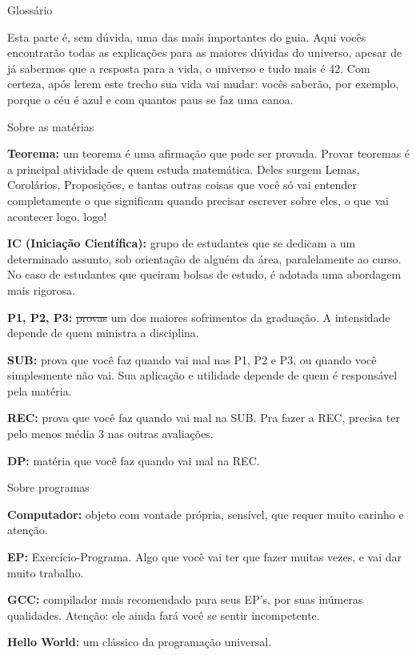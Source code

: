 \begin{secao}{Glossário}

Esta parte é, sem dúvida, uma das mais importantes do guia. Aqui vocês
encontrarão todas as explicações para as maiores dúvidas do universo, apesar de
já sabermos que a resposta para a vida, o universo e tudo mais é 42. Com
certeza, após lerem este trecho sua vida vai mudar: vocês saberão, por exemplo,
porque o céu é azul e com quantos paus se faz uma canoa.

\begin{subsecao}{Sobre as matérias}

{\bf Teorema:} um teorema é uma afirmação que pode ser provada. Provar
teoremas é a principal atividade de quem estuda matemática. Deles surgem Lemas,
Corolários, Proposições, e tantas outras coisas que você só vai entender
completamente o que significam quando precisar escrever sobre eles, o que vai
acontecer logo, logo!

{\bf IC (Iniciação Científica):} grupo de estudantes que se dedicam a um
determinado assunto, sob orientação de alguém da área, paralelamente ao curso.
No caso de estudantes que queiram bolsas de estudo, é adotada uma abordagem
mais rigorosa.

{\bf P1, P2, P3:} \sout{provas} um dos maiores sofrimentos da graduação. 
A intensidade depende de quem ministra a disciplina.

{\bf SUB:} prova que você faz quando vai mal nas P1, P2 e P3, ou quando você
simplesmente não vai. Sua aplicação e utilidade depende de quem é responsável
pela matéria.

{\bf REC:} prova que você faz quando vai mal na SUB. Pra fazer a REC, precisa
ter pelo menos média 3 nas outras avaliações.

{\bf DP:} matéria que você faz quando vai mal na REC.
\end{subsecao}

\begin{subsecao}{Sobre programas}

{\bf Computador:} objeto com vontade própria, sensível, que requer muito
carinho e atenção.

{\bf EP:} Exercício-Programa. Algo que você vai ter que fazer muitas vezes, e
vai dar muito trabalho.

{\bf GCC:} compilador mais recomendado para seus EP's, por suas inúmeras
qualidades. Atenção: ele ainda fará você se sentir incompetente.

{\bf Hello World:} um clássico da programação universal.


\end{subsecao}
\end{secao}

